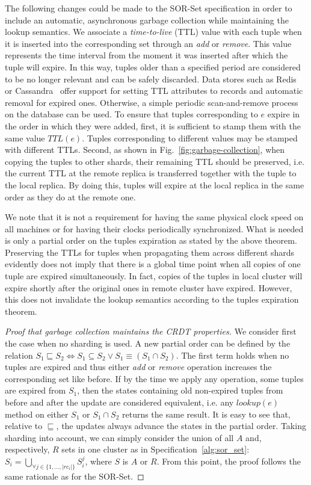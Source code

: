 The following changes could be made to the SOR-Set specification in order to
include an automatic, asynchronous garbage collection while maintaining the
lookup semantics. We associate a \textit{time-to-live} (TTL) value with each
tuple when it is inserted into the corresponding set through an \textit{add} or
\textit{remove}. This value represents the time interval from the moment it was
inserted after which the tuple will expire. In this way, tuples older than a
specified period are considered to be no longer relevant and can be safely
discarded. Data stores such as Redis~\cite{redis} or Cassandra~\cite{cassandra}
offer support for setting TTL attributes to records and automatic removal for
expired ones. Otherwise, a simple periodic scan-and-remove process on the
database can be used. To ensure that tuples corresponding to $e$ expire in the
order in which they were added, first, it is sufficient to stamp them with the
same value $TTL(e)$. Tuples corresponding to different values may be stamped
with different TTLs. Second, as shown in Fig.~\ref{fig:garbage-collection}, when
copying the tuples to other shards, their remaining TTL should be preserved,
i.e. the current TTL at the remote replica is transferred together with the
tuple to the local replica. By doing this, tuples will expire at the local
replica in the same order as they do at the remote one.

We note that it is not a requirement for having the same physical clock speed on
all machines or for having their clocks periodically synchronized. What is
needed is only a partial order on the tuples expiration as stated by the above
theorem. Preserving the TTLs for tuples when propagating them across different
shards evidently does not imply that there is a global time point when all
copies of one tuple are expired simultaneously. In fact, copies of the tuples in
local cluster will expire shortly after the original ones in remote cluster have
expired. However, this does not invalidate the lookup semantics according to the
tuples expiration theorem.

\begin{proof}[Proof that garbage collection maintains the CRDT properties]
We consider first the case when no sharding is used. A new partial order can be
defined by the relation $S_{1} \sqsubseteq S_{2} \iff S_{1} \subseteq S_{2} \lor
S_{1} \equiv (S_{1} \cap S_{2})$. The first term holds when no tuples are
expired and thus either \textit{add} or \textit{remove} operation increases the
corresponding set like before. If by the time we apply any operation, some
tuples are expired from $S_{1}$, then the states containing old non-expired
tuples from before and after the update are considered equivalent, i.e. any
$\textit{lookup}(e)$ method on either $S_{1}$ or $S_{1} \cap S_{2}$ returns the
same result. It is easy to see that, relative to $\sqsubseteq$, the updates
always advance the states in the partial order. Taking sharding into account, we
can simply consider the union of all $A$ and, respectively, $R$ sets in one
cluster as in Specification~\ref{alg:sor_set}: $S_{i} = \bigcup_{\forall j \in
\{1,\ldots,|rc_{i}|\}} S_{i}^{j}$, where $S$ is $A$ or $R$. From this point, the
proof follows the same rationale as for the SOR-Set.
\end{proof}